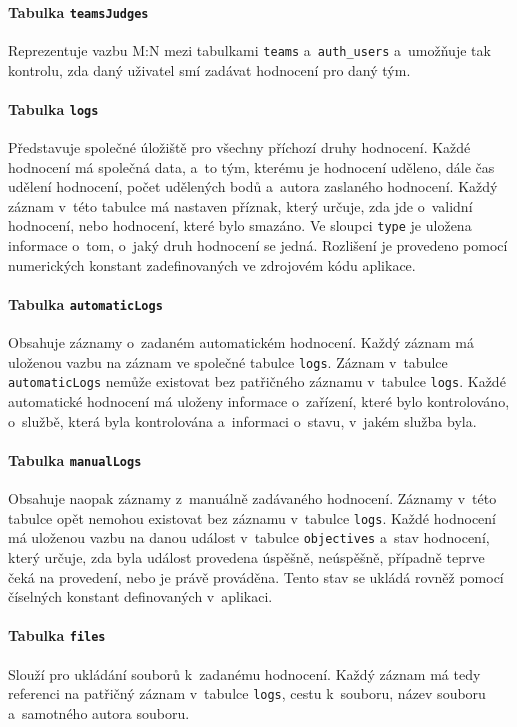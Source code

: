 \documentclass[
  digital,
  twoside,
  table, 
  nolof, 
  nolot
]{fithesis3}
\begin{document}
\paragraph{Tabulka \texttt{teamsJudges}} Reprezentuje vazbu M:N mezi tabulkami \texttt{teams} a~\texttt{auth\_users} a~umožňuje tak kontrolu, zda daný uživatel smí zadávat hodnocení pro daný tým. 

\paragraph{Tabulka \texttt{logs}} Představuje společné úložiště pro všechny příchozí druhy hodnocení. Každé hodnocení má společná data, a~to tým, kterému je hodnocení uděleno, dále čas udělení hodnocení, počet udělených bodů a~autora zaslaného hodnocení. Každý záznam v~této tabulce má nastaven příznak, který určuje, zda jde o~validní hodnocení, nebo hodnocení, které bylo smazáno. Ve sloupci \texttt{type} je uložena informace o~tom, o~jaký druh hodnocení se jedná. Rozlišení je provedeno pomocí numerických konstant zadefinovaných ve zdrojovém kódu aplikace.

\paragraph{Tabulka \texttt{automaticLogs}} Obsahuje záznamy o~zadaném automatickém hodnocení. Každý záznam má uloženou vazbu na záznam ve společné tabulce \texttt{logs}. Záznam v~tabulce \texttt{automaticLogs} nemůže existovat bez patřičného záznamu v~tabulce \texttt{logs}. Každé automatické hodnocení má uloženy informace o~zařízení, které bylo kontrolováno, o~službě, která byla kontrolována a~informaci o~stavu, v~jakém služba byla.

\paragraph{Tabulka \texttt{manualLogs}} Obsahuje naopak záznamy z~manuálně zadávaného hodnocení. Záznamy v~této tabulce opět nemohou existovat bez záznamu v~tabulce \texttt{logs}. Každé hodnocení má uloženou vazbu na danou událost v~tabulce \texttt{objectives} a~stav hodnocení, který určuje, zda byla událost provedena úspěšně, neúspěšně, případně  teprve čeká na provedení, nebo je právě prováděna. Tento stav se ukládá rovněž pomocí číselných konstant definovaných v~aplikaci.

\paragraph{Tabulka \texttt{files}} Slouží pro ukládání souborů k~zadanému hodnocení. Každý záznam má tedy referenci na patřičný záznam v~tabulce \texttt{logs}, cestu k~souboru, název souboru a~samotného autora souboru.
\end{document}
